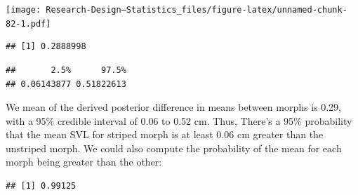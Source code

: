 \documentclass[
]{book}
\newenvironment{Shaded}{\begin{snugshade}}{\end{snugshade}}
\newcommand{\AttributeTok}[1]{\textcolor[rgb]{0.13,0.29,0.53}{#1}}
\newcommand{\CommentTok}[1]{\textcolor[rgb]{0.56,0.35,0.01}{\textit{#1}}}
\newcommand{\DecValTok}[1]{\textcolor[rgb]{0.00,0.00,0.81}{#1}}
\newcommand{\FloatTok}[1]{\textcolor[rgb]{0.00,0.00,0.81}{#1}}
\newcommand{\FunctionTok}[1]{\textcolor[rgb]{0.13,0.29,0.53}{\textbf{#1}}}
\newcommand{\NormalTok}[1]{#1}
\newcommand{\SpecialCharTok}[1]{\textcolor[rgb]{0.81,0.36,0.00}{\textbf{#1}}}
\begin{document}
\texttt{[image: Research-Design---Statistics\_files/figure-latex/unnamed-chunk-82-1.pdf]}

\begin{Shaded}
\end{Shaded}

\begin{verbatim}
## [1] 0.2888998
\end{verbatim}

\begin{Shaded}
\end{Shaded}

\begin{verbatim}
##       2.5%      97.5% 
## 0.06143877 0.51822613
\end{verbatim}

We mean of the derived posterior difference in means between morphs is 0.29, with a 95\% credible interval of 0.06 to 0.52 cm. Thus, There's a 95\% probability that the mean SVL for striped morph is at least 0.06 cm greater than the unstriped morph. We could also compute the probability of the mean for each morph being greater than the other:

\begin{Shaded}
\end{Shaded}

\begin{verbatim}
## [1] 0.99125
\end{verbatim}

\begin{Shaded}
\end{Shaded}
\end{document}
